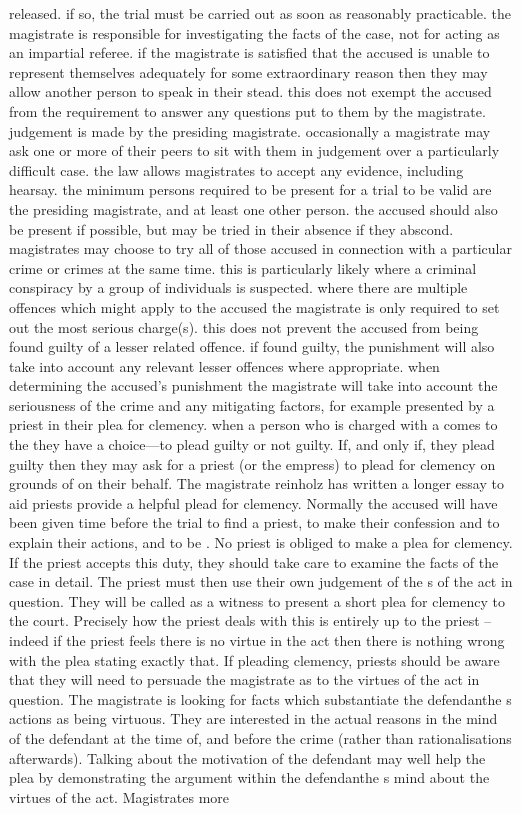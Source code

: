 released. if so, the trial must be carried out as soon as reasonably practicable. the magistrate is responsible for investigating the facts of the case, not for acting as an impartial referee. if the magistrate is satisfied that the accused is unable to represent themselves adequately for some extraordinary reason then they may allow another person to speak in their stead. this does not exempt the accused from the requirement to answer any questions put to them by the magistrate. judgement is made by the presiding magistrate. occasionally a magistrate may ask one or more of their peers to sit with them in judgement over a particularly difficult case. the law allows magistrates to accept any evidence, including hearsay. the minimum persons required to be present for a trial to be valid are the presiding magistrate, and at least one other person. the accused should also be present if possible, but may be tried in their absence if they abscond. magistrates may choose to try all of those accused in connection with a particular crime or crimes at the same time. this is particularly likely where a criminal conspiracy by a group of individuals is suspected. where there are multiple offences which might apply to the accused the magistrate is only required to set out the most serious charge(s). this does not prevent the accused from being found guilty of a lesser related offence. if found guilty, the punishment will also take into account any relevant lesser offences where appropriate. when determining the accused's punishment the magistrate will take into account the seriousness of the crime and any mitigating factors, for example presented by a priest in their plea for clemency. \localpar {} when a person who is charged with a  comes to the  they have a choice—to plead guilty or not guilty. If, and only if, they plead guilty then they may ask for a priest (or the empress) to plead for clemency on grounds of  on their behalf. The magistrate reinholz has written a longer essay to aid priests provide a helpful plead for clemency. Normally the accused will have been given time before the trial to find a priest, to make their confession and to explain their actions, and to be . No priest is obliged to make a plea for clemency. If the priest accepts this duty, they should take care to examine the facts of the case in detail. The priest must then use their own judgement of the s of the act in question. They will be called as a witness to present a short plea for clemency to the court. Precisely how the priest deals with this is entirely up to the priest – indeed if the priest feels there is no virtue in the act then there is nothing wrong with the plea stating exactly that. If pleading clemency, priests should be aware that they will need to persuade the magistrate as to the virtues of the act in question. The magistrate is looking for facts which substantiate the defendanthe s actions as being virtuous. They are interested in the actual reasons in the mind of the defendant at the time of, and before the crime (rather than rationalisations afterwards). Talking about the motivation of the defendant may well help the plea by demonstrating the argument within the defendanthe s mind about the virtues of the act. Magistrates more 